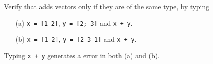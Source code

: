\documentclass{ximera}
\begin{document}
\begin{computerExercise}  \label{c1.2.2}
Verify that \Matlab adds vectors only if they are of the same type, by typing
\begin{enumerate}
\item[(a)]  {\tt x = [1 2]}, {\tt y = [2; 3]} and {\tt x + y}.
\item[(b)]  {\tt x = [1 2]}, {\tt y = [2 3 1]} and {\tt x + y}.
\end{enumerate}

\begin{solution}

\ans Typing {\tt x + y} generates a \Matlab error in both (a) and (b).

\end{solution}
\end{computerExercise}
\end{document}
